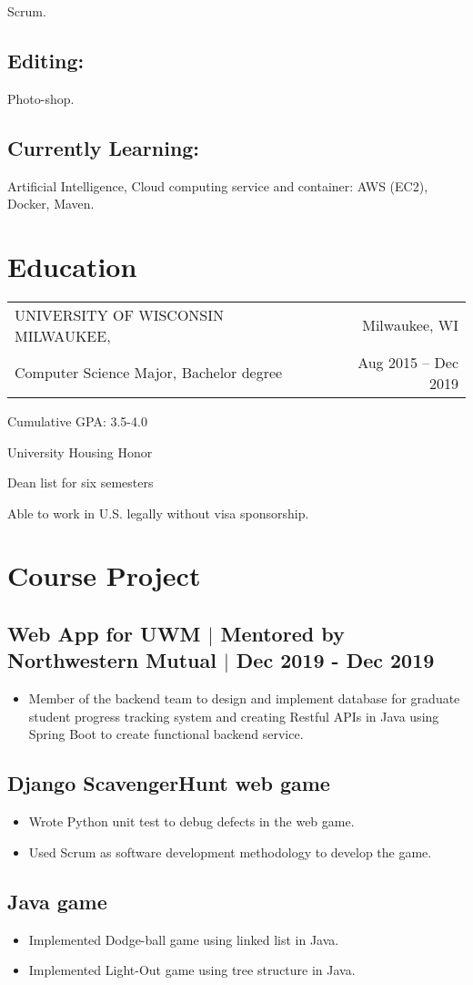 \documentclass{article}
\makeatletter
\newcommand{\schoolitem}[4]{
\begin{tabular*}{\textwidth}{l@{\extracolsep{\fill}}r}
  #1   &      #2 \\
  #3 &   #4 \\
\end{tabular*}
}
\newcommand{\schoolDoubleItem}[2]{
  {
    {#1}{: #2 \vspace{-1pt}}
  }
}
\newcommand{\schoolSingleItem}[1]{
  {
    {#1}{\vspace{-1pt}}
  }
}
\makeatother
\begin{document}
Scrum.

\subsection{Editing:}

Photo-shop.

\subsection{Currently Learning:}

Artificial Intelligence, Cloud computing service and container: AWS (EC2), Docker, Maven.

\section{Education}

\schoolitem
{UNIVERSITY OF WISCONSIN MILWAUKEE,}{Milwaukee, WI}
{Computer Science Major, Bachelor degree}{Aug 2015 -- Dec 2019}

\schoolDoubleItem{Cumulative GPA} {3.5-4.0}

\schoolSingleItem{University Housing Honor}

\schoolSingleItem{Dean list for six semesters}

\schoolSingleItem{Able to work in U.S. legally without visa sponsorship.}

\section{Course Project}

\subsection{Web App for UWM {$\mid$} Mentored by Northwestern Mutual {$\mid$} Dec 2019 - Dec 2019}
\begin{itemize}
\item{Member of the backend team to design and implement database for graduate student progress tracking system and creating Restful APIs in Java using Spring Boot to create functional backend service.}
\end{itemize}
\vspace{.2cm}
\subsection{Django ScavengerHunt web game}
\begin{itemize}
\item{Wrote Python unit test to debug defects in the web game.}
\item{Used Scrum as software development methodology to develop the game.}
\end{itemize}
\vspace{.2cm}
\subsection{Java game}
\begin{itemize}
\item{Implemented Dodge-ball game using linked list in Java.}
\item{Implemented Light-Out game using tree structure in Java.}
\end{itemize}
\end{document}
